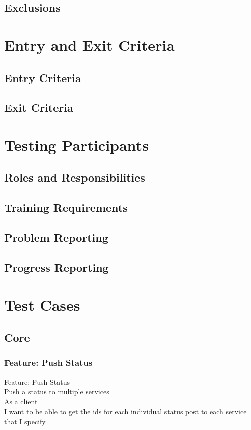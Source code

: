 \documentclass[12pt]{article}
\begin{document}
\subsection{Exclusions}

\section{Entry and Exit Criteria}
\subsection{Entry Criteria}
\subsection{Exit Criteria}

\section{Testing Participants}
\subsection{Roles and Responsibilities}
\subsection{Training Requirements}
\subsection{Problem Reporting}
\subsection{Progress Reporting}

\section{Test Cases}

\subsection{Core}

\subsubsection{Feature: Push Status}

Feature: Push Status \\
	Push a status to multiple services \\
	As a client \\
	I want to be able to get the ids for each individual status post to each  
	service that I specify. \\
	
\end{document}

